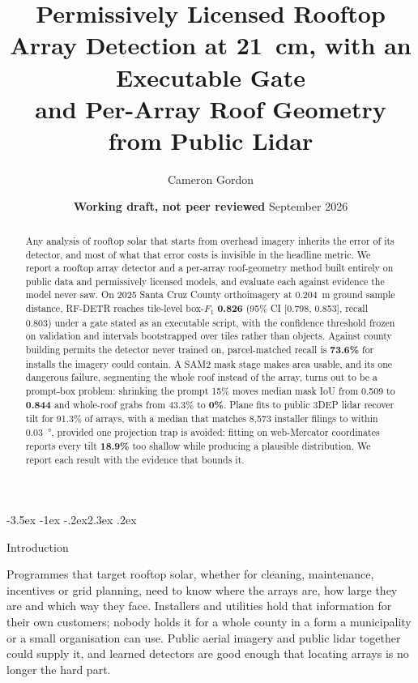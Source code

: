 \documentclass[10pt,twocolumn]{article}
\title{\bf Permissively Licensed Rooftop Array Detection at \SI{21}{\centi\metre},
with an Executable Gate\\
\large and Per-Array Roof Geometry from Public Lidar}
\author{Cameron Gordon}
\date{\normalsize\textbf{Working draft, not peer reviewed} \quad September 2026}
\makeatletter
\renewcommand\section{\@startsection{section}{1}{\z@}%
  {-3.5ex \@plus -1ex \@minus -.2ex}{2.3ex \@plus.2ex}%
  {\normalfont\Large\bfseries\raggedright}}
\makeatother
\begin{document}
\maketitle

\begin{abstract}
\noindent
Any analysis of rooftop solar that starts from overhead imagery inherits the error of its
detector, and most of what that error costs is invisible in the headline metric. We report
a rooftop array detector and a per-array roof-geometry method built entirely on public data
and permissively licensed models, and evaluate each against evidence the model never saw.
On 2025 Santa Cruz County orthoimagery at \SI{0.204}{\metre} ground sample distance,
RF-DETR reaches tile-level box-$F_1$ \textbf{0.826} (95\% CI [0.798, 0.853], recall 0.803)
under a gate stated as an executable script, with the confidence threshold frozen on
validation and intervals bootstrapped over tiles rather than objects. Against county
building permits the detector never trained on, parcel-matched recall is \textbf{73.6\%}
for installs the imagery could contain. A SAM2 mask stage makes area usable, and its one
dangerous failure, segmenting the whole roof instead of the array, turns out to be a
prompt-box problem: shrinking the prompt 15\% moves median mask IoU from 0.509 to
\textbf{0.844} and whole-roof grabs from 43.3\% to \textbf{0\%}. Plane fits to public 3DEP
lidar recover tilt for 91.3\% of arrays, with a median that matches 8{,}573 installer
filings to within \SI{0.03}{\degree}, provided one projection trap is avoided: fitting on
web-Mercator coordinates reports every tilt \textbf{18.9\%} too shallow while producing a
plausible distribution. We report each result with the evidence that bounds it.
\end{abstract}

\section{Introduction}
\label{sec:intro}

Programmes that target rooftop solar, whether for cleaning, maintenance, incentives or
grid planning, need to know where the arrays are, how large they are and which way they
face. Installers and utilities hold that information for their own customers; nobody holds
it for a whole county in a form a municipality or a small organisation can use. Public
aerial imagery and public lidar together could supply it, and learned detectors are good
enough that locating arrays is no longer the hard part.
\end{document}
